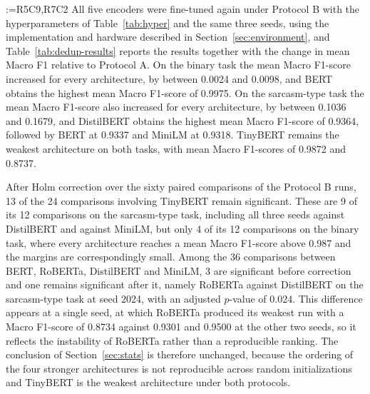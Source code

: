 \documentclass[a4paper,fleqn]{cas-sc}
\makeatletter
\newif\iftracked
\newcommand{\rv@setcolour}[1]{%
  \IfStrEq{#1}{R7C7}{\color{rvEdit}}{%
    \IfSubStr{#1}{R5}{\IfSubStr{#1}{R7}{\color{rvBoth}}{\color{rvFive}}}{\color{rvSeven}}}}
\newcommand{\rv@tag}[1]{\textsuperscript{\sffamily\bfseries\scriptsize[\StrSubstitute{#1}{,}{, }]}\,}
\newcommand{\rv@recordone}[1]{%
  \edef\rv@i{#1}%
  \ifcsdef{rv@n@\rv@i}{}{\csgdef{rv@n@\rv@i}{0}}%
  \csxdef{rv@n@\rv@i}{\the\numexpr\csuse{rv@n@\rv@i}+1\relax}%
  \begingroup\edef\@currentlabel{\rv@i}\label{rv:\rv@i:\csuse{rv@n@\rv@i}}\endgroup}
\newcommand{\rv@record}[1]{\@for\rv@id:=#1\do{\expandafter\rv@recordone\expandafter{\rv@id}}}
\newenvironment{rcblock}[1]{\rv@record{#1}\iftracked\rv@setcolour{#1}\leavevmode\rv@tag{#1}\fi\ignorespaces}{\par}
\makeatother
\begin{document}
\begin{rcblock}{R5C9,R7C2}
All five encoders were fine-tuned again under Protocol B with the hyperparameters of Table~\ref{tab:hyper} and the same three seeds, using the implementation and hardware described in Section~\ref{sec:environment}, and Table~\ref{tab:dedup-results} reports the results together with the change in mean Macro F1 relative to Protocol A. On the binary task the mean Macro F1-score increased for every architecture, by between 0.0024 and 0.0098, and BERT obtains the highest mean Macro F1-score of 0.9975. On the sarcasm-type task the mean Macro F1-score also increased for every architecture, by between 0.1036 and 0.1679, and DistilBERT obtains the highest mean Macro F1-score of 0.9364, followed by BERT at 0.9337 and MiniLM at 0.9318. TinyBERT remains the weakest architecture on both tasks, with mean Macro F1-scores of 0.9872 and 0.8737.

After Holm correction over the sixty paired comparisons of the Protocol B runs, 13 of the 24 comparisons involving TinyBERT remain significant. These are 9 of its 12 comparisons on the sarcasm-type task, including all three seeds against DistilBERT and against MiniLM, but only 4 of its 12 comparisons on the binary task, where every architecture reaches a mean Macro F1-score above 0.987 and the margins are correspondingly small. Among the 36 comparisons between BERT, RoBERTa, DistilBERT and MiniLM, 3 are significant before correction and one remains significant after it, namely RoBERTa against DistilBERT on the sarcasm-type task at seed 2024, with an adjusted $p$-value of 0.024. This difference appears at a single seed, at which RoBERTa produced its weakest run with a Macro F1-score of 0.8734 against 0.9301 and 0.9500 at the other two seeds, so it reflects the instability of RoBERTa rather than a reproducible ranking. The conclusion of Section~\ref{sec:stats} is therefore unchanged, because the ordering of the four stronger architectures is not reproducible across random initializations and TinyBERT is the weakest architecture under both protocols.


\end{rcblock}
\end{document}
